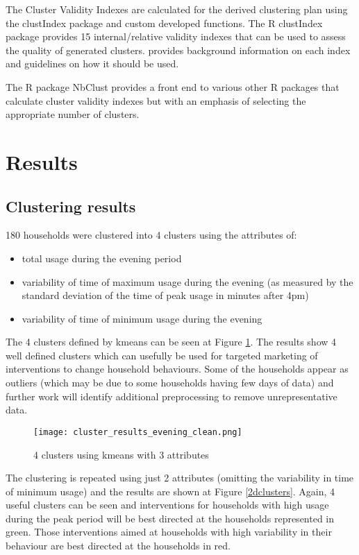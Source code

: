 \documentclass[conference]{IEEEtran}
\begin{document}
The Cluster Validity Indexes are calculated for the derived clustering plan using the clustIndex package and custom developed functions. The R clustIndex package provides 15 internal/relative validity indexes that can be used to assess the quality of generated clusters. \cite{dimitriadou2002examination} provides background information on each index and guidelines on how it should be used.

The R package NbClust \cite{charrad2012package} provides a front end to various other R packages that calculate cluster validity indexes but with an emphasis of selecting the appropriate number of clusters.

\section{Results}

\subsection{Clustering results}
180 households were clustered into 4 clusters using the attributes of:
\begin{itemize}
\item total usage during the evening period
\item variability of time of maximum usage during the evening (as measured by the standard deviation of the time of peak usage in minutes after 4pm)
\item variability of time of minimum usage during the evening
\end{itemize}

The 4 clusters defined by kmeans can be seen at Figure \ref{3dclusters}. The results show 4 well defined clusters which can usefully be used for targeted marketing of interventions to change household behaviours. Some of the households appear as outliers (which may be due to some households having few days of data) and further work will identify additional preprocessing to remove unrepresentative data.

\begin{figure}[h]
\centering
\texttt{[image: cluster\_results\_evening\_clean.png]}
\caption{4 clusters using kmeans with 3 attributes}
\label{3dclusters}
\end{figure}

The clustering is repeated using just 2 attributes (omitting the variability in time of minimum usage) and the results are shown at Figure \ref{2dclusters}. Again, 4 useful clusters can be seen and interventions for households with high usage during the peak period will be best directed at the households represented in green. Those interventions aimed at households with high variability in their behaviour are best directed at the households in red.
\end{document}
